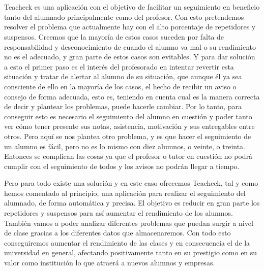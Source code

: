 \chapter{\propuestaValor}

\paragraph{}
Teacheck es una aplicación con el objetivo de facilitar un seguimiento en beneficio tanto del alumnado principalmente como del profesor. Con esto pretendemos resolver el problema que actualmente hay con el alto porcentaje de repetidores y suspensos. Creemos que la mayoría de estos casos suceden por falta de responsabilidad y desconocimiento de cuando el alumno va mal o su rendimiento no es el adecuado, y gran parte de estos casos son evitables. Y para dar solución a esto el primer paso es el interés del profesorado en intentar revertir esta situación y tratar de alertar al alumno de su situación, que aunque él ya sea consciente de ello en la mayoría de los casos, el hecho de recibir un aviso o consejo de forma adecuada, esto es, teniendo en cuenta cual es la manera correcta de decir y plantear los problemas, puede hacerle cambiar. Por lo tanto, para conseguir esto es necesario el seguimiento del alumno en cuestión y poder tanto ver cómo tener presente sus notas, asistencia, motivación y sus entregables entre otros. Pero aquí se nos plantea otro problema, y es que hacer el seguimiento de un alumno es fácil, pero no es lo mismo con diez alumnos, o veinte, o treinta. Entonces se complican las cosas ya que el profesor o tutor en cuestión no podrá cumplir con el seguimiento de todos y los avisos no podrán llegar a tiempo. 

Pero para todo existe una solución y en este caso ofrecemos Teacheck, tal y como hemos comentado al principio, una aplicación para realizar el seguimiento del alumnado, de forma automática y precisa. El objetivo es reducir en gran parte los repetidores y suspensos para así aumentar el rendimiento de los alumnos. También vamos a poder analizar diferentes problemas que puedan surgir a nivel de clase gracias a los diferentes datos que almacenaremos. Con todo esto conseguiremos aumentar el rendimiento de las clases y en consecuencia el de la universidad en general, afectando positivamente tanto en su prestigio como en su valor como institución lo que atraerá a nuevos alumnos y empresas.































